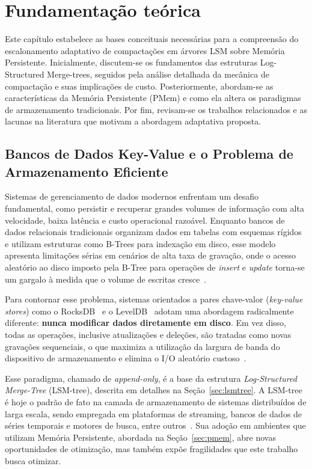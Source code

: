 \chapter{Fundamentação teórica}\label{cap:fundamentacao}
Este capítulo estabelece as bases conceituais necessárias para a compreensão do escalonamento adaptativo de compactações em árvores LSM sobre Memória Persistente. Inicialmente, discutem-se os fundamentos das estruturas Log-Structured Merge-trees, seguidos pela análise detalhada da mecânica de compactação e suas implicações de custo. Posteriormente, abordam-se as características da Memória Persistente (PMem) e como ela altera os paradigmas de armazenamento tradicionais. Por fim, revisam-se os trabalhos relacionados e as lacunas na literatura que motivam a abordagem adaptativa proposta.

\section{Bancos de Dados Key-Value e o Problema de Armazenamento Eficiente}

Sistemas de gerenciamento de dados modernos enfrentam um desafio fundamental, como
persistir e recuperar grandes volumes de informação com alta velocidade, baixa
latência e custo operacional razoável. Enquanto bancos de dados relacionais
tradicionais organizam dados em tabelas com esquemas rígidos e utilizam estruturas
como B-Trees para indexação em disco, esse modelo apresenta limitações sérias em
cenários de alta taxa de gravação, onde o acesso aleatório ao disco imposto pela
B-Tree para operações de \textit{insert} e \textit{update} torna-se um gargalo
à medida que o volume de escritas cresce~\cite{database_internals}.

Para contornar esse problema, sistemas orientados a pares chave-valor
(\textit{key-value stores}) como o RocksDB~\cite{rocksdb} e o
LevelDB~\cite{leveldb} adotam uma abordagem radicalmente
diferente: \textbf{nunca modificar dados diretamente em disco}. Em vez disso,
todas as operações, inclusive atualizações e deleções, são tratadas como
novas gravações sequenciais, o que maximiza a utilização da largura de banda do
dispositivo de armazenamento e elimina o I/O aleatório custoso~\cite{lsm_survey}.

Esse paradigma, chamado de \textit{append-only}, é a base da estrutura
\textit{Log-Structured Merge-Tree} (LSM-tree), descrita em detalhes na
Seção~\ref{sec:lsmtree}. A LSM-tree é hoje o padrão de fato na camada de
armazenamento de sistemas distribuídos de larga escala, sendo empregada em
plataformas de streaming, bancos de dados de séries temporais e motores de busca,
entre outros~\cite{rocksdb,lsm_survey}. Sua adoção em ambientes que utilizam
Memória Persistente, abordada na Seção~\ref{sec:pmem}, abre novas
oportunidades de otimização, mas também expõe fragilidades que este trabalho
busca otimizar.

